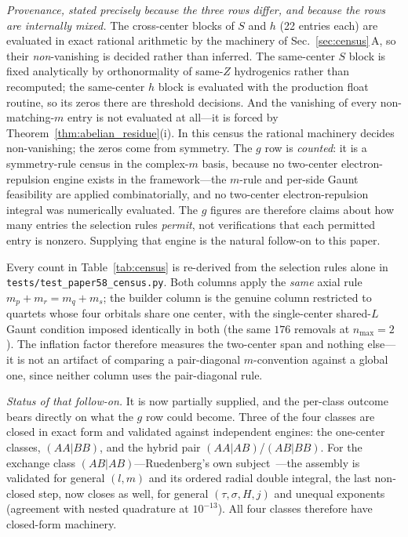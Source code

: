 \documentclass[aps,pra,twocolumn,superscriptaddress,longbibliography]{revtex4-2}
\begin{document}
\emph{Provenance, stated precisely because the three rows differ, and
because the rows are internally mixed.} The cross-center blocks of $S$ and
$h$ (22 entries each) are evaluated in exact rational arithmetic by the
machinery of Sec.~\ref{sec:census}\,A, so their \emph{non}-vanishing is
decided rather than inferred.  The same-center $S$ block is fixed
analytically by orthonormality of same-$Z$ hydrogenics rather than
recomputed; the same-center $h$ block is evaluated with the production
float routine, so its zeros there are threshold decisions.  And the
vanishing of every non-matching-$m$ entry is not evaluated at all---it is
forced by Theorem~\ref{thm:abelian_residue}(i).  In this census the
rational machinery decides non-vanishing; the zeros come from symmetry.  The $g$ row is \emph{counted}: it is a
symmetry-rule census in the complex-$m$ basis, because no two-center
electron-repulsion engine exists in the framework---the $m$-rule and
per-side Gaunt feasibility are applied combinatorially, and no two-center
electron-repulsion integral was numerically evaluated.  The $g$ figures
are therefore claims about how many entries the selection rules
\emph{permit}, not verifications that each permitted entry is nonzero.
Supplying that engine is the natural follow-on to this paper.

Every count in Table~\ref{tab:census} is re-derived from the selection
rules alone in \texttt{tests/test\_paper58\_census.py}.  Both columns
apply the \emph{same} axial rule $m_p + m_r = m_q + m_s$; the builder
column is the genuine column restricted to quartets whose four
orbitals share one center, with the single-center shared-$L$ Gaunt
condition imposed identically in both (the same $176$ removals at
$n_{\max}=2$).  The inflation factor therefore measures the
two-center span and nothing else---it is not an artifact of
comparing a pair-diagonal $m$-convention against a global one,
since neither column uses the pair-diagonal rule.

\emph{Status of that follow-on.}  It is now partially supplied, and the
per-class outcome bears directly on what the $g$ row could become.  Three
of the four classes are closed in exact form and validated against
independent engines: the one-center classes, $(AA|BB)$, and the hybrid
pair $(AA|AB)$/$(AB|BB)$.  For the exchange class $(AB|AB)$---Ruedenberg's
own subject~\cite{ruedenberg1951}---the assembly is validated for general
$(l,m)$ and its ordered radial double integral, the last non-closed step,
now closes as well, for general $(\tau, \sigma, H, j)$ and unequal
exponents (agreement with nested quadrature at $10^{-13}$).  All four
classes therefore have closed-form machinery.
\end{document}
